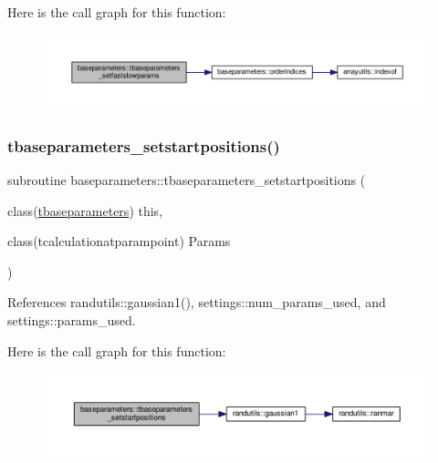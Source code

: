 Here is the call graph for this function\+:
\nopagebreak
\begin{figure}[H]
\begin{center}
\leavevmode
\includegraphics[width=350pt]{namespacebaseparameters_ac8f2cdce695f77b0f9cc3c2e86a9c05f_cgraph}
\end{center}
\end{figure}
\mbox{\label{namespacebaseparameters_a1c41b4dbd4418bb1d16d77034504ac0b}} 
\subsubsection{\texorpdfstring{tbaseparameters\+\_\+setstartpositions()}{tbaseparameters\_setstartpositions()}}
{\footnotesize\ttfamily subroutine baseparameters\+::tbaseparameters\+\_\+setstartpositions (\begin{DoxyParamCaption}\item[{class(\mbox{\hyperlink{structbaseparameters_1_1tbaseparameters}{tbaseparameters}})}]{this,  }\item[{class(tcalculationatparampoint)}]{Params }\end{DoxyParamCaption})\hspace{0.3cm}{\ttfamily [private]}}



References randutils\+::gaussian1(), settings\+::num\+\_\+params\+\_\+used, and settings\+::params\+\_\+used.

Here is the call graph for this function\+:
\nopagebreak
\begin{figure}[H]
\begin{center}
\leavevmode
\includegraphics[width=350pt]{namespacebaseparameters_a1c41b4dbd4418bb1d16d77034504ac0b_cgraph}
\end{center}
\end{figure}
\mbox{\label{namespacebaseparameters_a6fa6c72334203001f2e2932139df534d}} 
